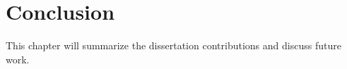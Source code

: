 \chapter{Conclusion}

This chapter will summarize the dissertation contributions and discuss future work.
